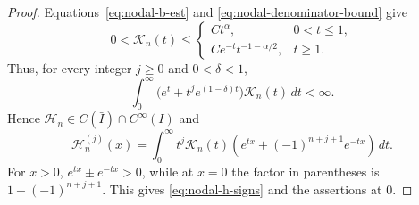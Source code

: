 \documentclass[11pt]{amsart}
\numberwithin{equation}{section}
\theoremstyle{remark}
\begin{document}
\begin{proof}
Equations~\eqref{eq:nodal-b-est} and \eqref{eq:nodal-denominator-bound} give
\begin{equation}\label{eq:nodal-K-est}
 0<\mathcal K_n(t)\le
 \begin{cases}
 Ct^\alpha,&0<t\le1,\\
 Ce^{-t}t^{-1-\alpha/2},&t\ge1.
 \end{cases}
\end{equation}
Thus, for every integer $j\ge0$ and $0<\delta<1$,
\[
 \int_0^\infty\bigl(e^t+t^je^{(1-\delta)t}\bigr)\mathcal K_n(t)\,dt<\infty.
\]
Hence $\mathcal H_n\in C(\bar{I})\cap C^\infty(I)$ and
\begin{equation}\label{eq:nodal-h-derivatives}
 \mathcal H_n^{(j)}(x)=\int_0^\infty t^j\mathcal K_n(t)
       (e^{tx}+(-1)^{n+j+1}e^{-tx})\,dt.
\end{equation}
For $x>0$, $e^{tx}\pm e^{-tx}>0$, while at $x=0$ the factor in parentheses
is $1+(-1)^{n+j+1}$. This gives \eqref{eq:nodal-h-signs} and the assertions at $0$.


\end{proof}
\end{document}
